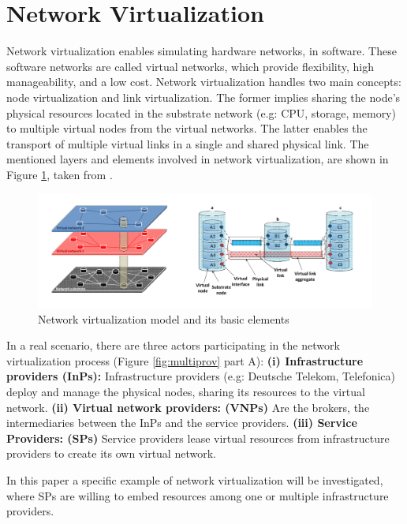 \section{Network Virtualization}

Network virtualization enables simulating hardware networks, in software. These software networks are called virtual networks, which provide flexibility, high manageability, and a low cost. Network virtualization handles two main concepts: node virtualization and link virtualization. The former implies sharing the node's physical resources located in the substrate network (e.g: CPU, storage, memory) to multiple virtual nodes from the virtual networks. The latter enables the transport of multiple virtual links in a single and shared physical link. The mentioned layers and elements involved in network virtualization, are shown in Figure \ref{fig:networkvir}, taken from \cite{carapinha2009network}.


\begin{figure}
  \centering
  	\includegraphics[scale=0.8]{gfx/networkvir.png}
  \caption{Network virtualization model and its basic elements}
  \label{fig:networkvir}
\end{figure}

In a real scenario, there are three actors participating in the network virtualization process (Figure \ref{fig:multiprov} part A): \newline
\textbf{ (i) Infrastructure providers (InPs):} Infrastructure providers (e.g: Deutsche Telekom, Telefonica) deploy and manage the physical nodes, sharing its resources to the virtual network. \newline
\textbf{ (ii) Virtual network providers: (VNPs)} Are the brokers, the intermediaries between the InPs and the service providers. \newline
\textbf{ (iii) Service Providers: (SPs)} Service providers lease virtual resources from infrastructure providers to create its own virtual network. 

In this paper a specific example of network virtualization will be investigated, where SPs are willing to embed resources among one or multiple infrastructure providers.


